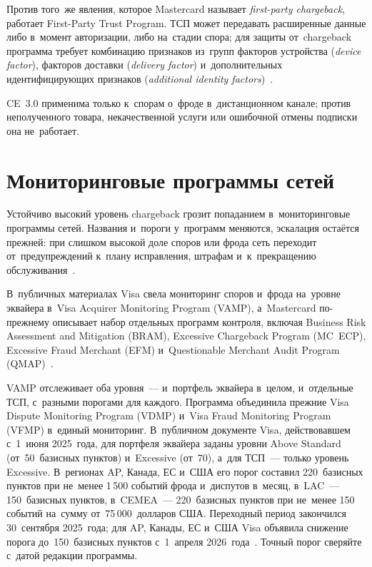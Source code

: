 Против того~же явления, которое Mastercard называет \emph{first-party
chargeback}, работает First-Party Trust Program. ТСП может передавать расширенные данные либо
в~момент авторизации, либо на~стадии спора; для защиты от~chargeback
программа требует комбинацию признаков из~групп факторов устройства
(\textit{device factor}), факторов доставки (\textit{delivery factor})
и~дополнительных идентифицирующих признаков (\textit{additional identity
factors})~\cite{mc-first-party-trust,mc-dispute-management}.

CE~3.0 применима только к~спорам о~фроде в~дистанционном канале; против
неполученного товара, некачественной услуги или ошибочной отмены подписки она
не~работает.

\section{Мониторинговые программы сетей}\label{sec:disputes-monitoring}

Устойчиво высокий уровень chargeback грозит попаданием в~мониторинговые
программы сетей. Названия и~пороги у~программ меняются, эскалация остаётся
прежней: при слишком высокой доле споров или фрода сеть переходит
от~предупреждений к~плану исправления, штрафам и~к~прекращению
обслуживания~\cite{visa-core-rules,mc-chargeback-guide}.

В~публичных материалах Visa свела мониторинг споров и~фрода на~уровне эквайера
в~Visa Acquirer Monitoring Program (VAMP), а~Mastercard
по-прежнему описывает набор отдельных программ контроля, включая Business Risk
Assessment and Mitigation (BRAM), Excessive Chargeback Program (MC~ECP),
Excessive Fraud Merchant (EFM) и~Questionable Merchant Audit Program
(QMAP)~\cite{visa-vamp-intro,mc-compliance-programs}.

VAMP отслеживает оба уровня~--- и~портфель эквайера в~целом, и~отдельные ТСП,
с~разными порогами для каждого. Программа
объединила прежние Visa Dispute Monitoring Program (VDMP) и~Visa Fraud
Monitoring Program (VFMP) в~единый мониторинг. В~публичном документе Visa,
действовавшем с~1~июня 2025~года, для портфеля эквайера заданы уровни Above
Standard (от~50~базисных пунктов) и~Excessive (от~70), а~для ТСП~--- только
уровень Excessive. В~регионах AP, Канада, ЕС и~США его порог составил
220~базисных пунктов при не~менее 1\,500 событий фрода и~диспутов в~месяц,
в~LAC~--- 150~базисных пунктов, в~CEMEA~--- 220~базисных пунктов при не~менее
150 событий на~сумму от~75\,000~долларов США. Переходный период закончился
30~сентября 2025~года; для AP, Канады, ЕС и~США Visa объявила снижение порога
до~150~базисных пунктов с~1~апреля 2026~года~\cite{visa-vamp-fact-sheet-2025}.
Точный порог сверяйте с~датой редакции программы.

